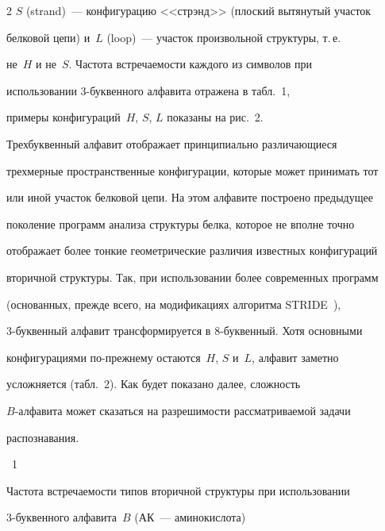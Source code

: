 \begin{multicols}{2}
$S$ (strand)~--- конфигурацию <<стрэнд>> (плоский вытянутый участок 

белковой цепи) и~$L$ (loop)~--- участок произвольной структуры, т.\,е.\ 

не~$H$ и не~$S$. Частота встреча\-емости каждого из символов при 

использовании 3-бук\-вен\-но\-го алфавита отражена в табл.~1, 

примеры конфигураций~$H$, $S$, $L$ показаны на рис.~2.



    Трехбуквенный алфавит отображает принципиально различающиеся 

трехмерные пространственные конфигурации, которые может принимать тот 

или иной участок белковой цепи. На этом алфавите построено предыдущее 

поколение программ анализа структуры белка, которое не вполне точно 

отображает более тонкие геометрические различия известных конфигураций 

вторичной структуры. Так, при использовании более современных программ 

(основанных, прежде всего, на модификациях алгоритма STRIDE~\cite{13tor}), 

3-бук\-вен\-ный алфавит трансформируется в 8-бук\-вен\-ный. Хотя основными 

конфигурациями по-прежнему остаются~$H$, $S$ и~$L$, алфавит заметно 

усложняется (табл.~2). Как будет показано далее, сложность 

$B$-алфавита может сказаться на разрешимости рассматриваемой задачи 

распозна\-вания.



\bigskip




\noindent

{{\tablename~1}\ \ \small{Частота встречаемости типов вторичной структуры при использовании 

3-буквенного алфавита~$B$ (АК~--- аминокислота)}}


\vspace*{2pt}



{\small \begin{center}


\end{center}}
\end{multicols}
